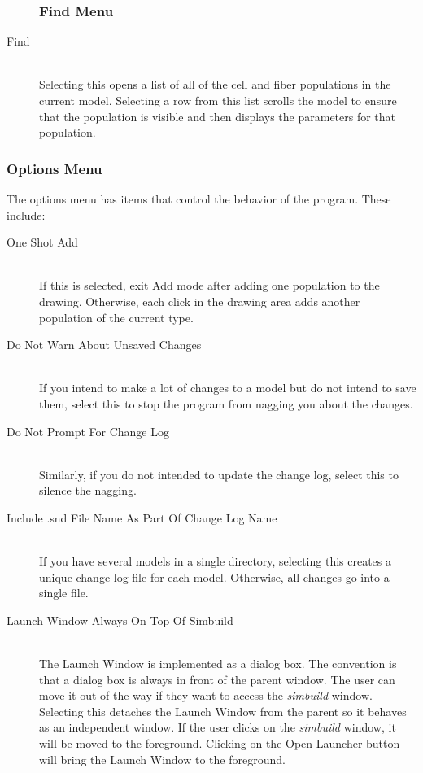 \documentclass[12pt,openany,oneside]{book}
\newcommand{\prog}[1]{\textit{{#1}}}
\begin{document}
\begin{description}
\subsubsection{Find Menu}
   \item [Find] \hfill \\ 
      Selecting this opens a list of all of the cell and fiber populations 
      in the current model. Selecting a row from this list scrolls the model 
      to ensure that the population is visible and then displays the 
      parameters for that population.
\end{description}

\subsubsection{Options Menu}
The options menu has items that control the behavior of the program. These include:

\begin{description}
   \item [One Shot Add] \hfill \\ 
      If this is selected, exit Add mode after adding one population to the drawing. 
      Otherwise, each click in the drawing area adds another population of 
      the current type.
   \item [Do Not Warn About Unsaved Changes] \hfill \\ 
      If you intend to make a lot of changes to a model but do not intend to save them, 
      select this to stop the program from nagging you about the changes.
   \item [Do Not Prompt For Change Log] \hfill \\
      Similarly, if you do not intended to update the change log, 
      select this to silence the nagging.
   \item [Include .snd File Name As Part Of Change Log Name] \hfill \\
      If you have several models in a single directory, selecting this creates 
      a unique change log file for each model. Otherwise, all changes go 
      into a single file.
   \item [Launch Window Always On Top Of Simbuild] \hfill \\
      The Launch Window is implemented as a dialog box. 
      The convention is that a dialog box is always in front of the 
      parent window. The user can move it out of the way if they want 
      to access the \prog{simbuild} window. Selecting this detaches the 
      Launch Window from the parent so it behaves as an independent 
      window. If the user clicks on 
      the \prog{simbuild} window, it will be moved to the 
      foreground. Clicking on the Open Launcher button will 
      bring the Launch Window to the foreground.
\end{description}
      
\end{document}
